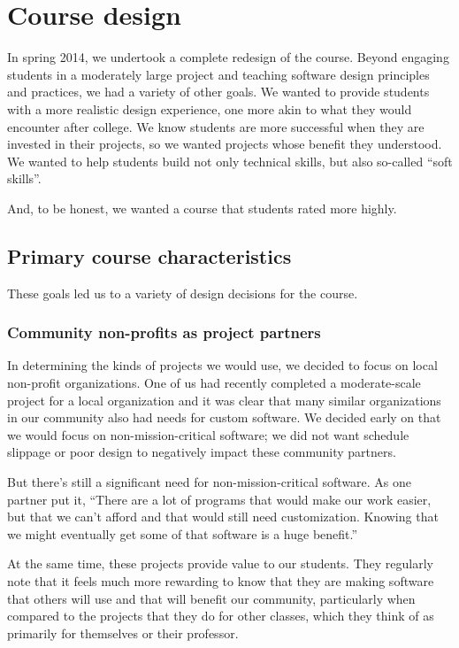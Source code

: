 \section{Course design}


In spring 2014, we undertook a complete redesign of the course.  
Beyond engaging students in a moderately large project and teaching 
software design principles and practices, 
we had a variety of other goals. 
We wanted
to provide students with a more realistic design experience, one more
akin to what they would encounter after college.  We know students
are more successful when they are invested in their projects, so we
wanted projects whose benefit they understood.  We wanted to help
students build not only technical skills, but also so-called ``soft
skills''.  

And, to be honest, we wanted a course that students rated more highly.

\subsection{Primary course characteristics}

These goals led us to a variety of design decisions for the course.

\subsubsection{Community non-profits as project partners}

In determining the kinds of projects we would use, we decided to
focus on local non-profit organizations.  One of us had recently
completed a moderate-scale project for a local organization and it
was clear that many similar organizations in our community also had
needs for custom software.  We decided early on that we would focus
on non-mission-critical software; we did not want schedule slippage
or poor design to negatively impact these community partners.

But there's still a significant need for non-mission-critical software.
As one partner put it, ``There are a lot of programs that would make
our work easier, but that we can't afford and that would still need
customization.  Knowing that we might eventually get some of that
software is a huge benefit.''  

At the same time, these projects provide value to our students.  They
regularly note that it feels much more rewarding to know that they are
making software that others will use and that will benefit our community,
particularly when compared to the projects that they do for other classes,
which they think of as primarily for themselves or their professor.

